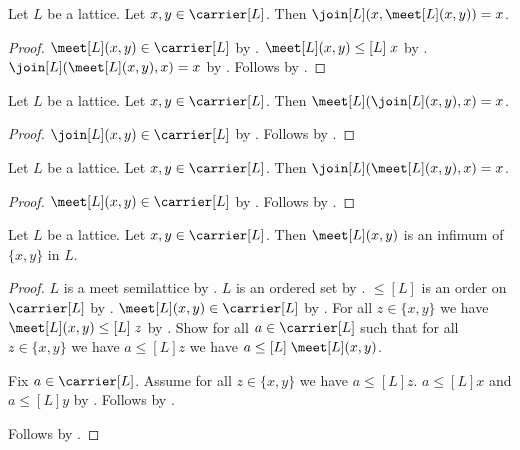 \begin{proposition}\label{join_meet_absorption}
    Let $L$ be a lattice.
    Let $x,y\in\carrier[L]$.
    Then $\join[L](x,\meet[L](x,y))=x$.
\end{proposition}
\begin{proof}
    $\meet[L](x,y)\in\carrier[L]$ by
        .
    $\meet[L](x,y)\mathrel{\leq[L]}x$ by
        .
    $\join[L](\meet[L](x,y),x)=x$ by
        .
    Follows by
        .
\end{proof}

\begin{proposition}\label{meet_join_absorption_commuted}
    Let $L$ be a lattice.
    Let $x,y\in\carrier[L]$.
    Then $\meet[L](\join[L](x,y),x)=x$.
\end{proposition}
\begin{proof}
    $\join[L](x,y)\in\carrier[L]$ by
        .
    Follows by
        .
\end{proof}

\begin{proposition}\label{join_meet_absorption_commuted}
    Let $L$ be a lattice.
    Let $x,y\in\carrier[L]$.
    Then $\join[L](\meet[L](x,y),x)=x$.
\end{proposition}
\begin{proof}
    $\meet[L](x,y)\in\carrier[L]$ by
        .
    Follows by
        .
\end{proof}

\begin{proposition}\label{meet_is_infimum_pair}
    Let $L$ be a lattice.
    Let $x,y\in\carrier[L]$.
    Then $\meet[L](x,y)$ is an infimum of $\{x,y\}$ in $L$.
\end{proposition}
\begin{proof}
    $L$ is a meet semilattice by .
    $L$ is an ordered set by .
    $\leq[L]$ is an order on $\carrier[L]$ by
        .
    $\meet[L](x,y)\in\carrier[L]$ by .
    For all $z\in\{x,y\}$ we have
        $\meet[L](x,y)\mathrel{\leq[L]}z$ by
        .
    Show for all $a\in\carrier[L]$ such that
        for all $z\in\{x,y\}$ we have $a\mathrel{\leq[L]}z$
        we have $a\mathrel{\leq[L]}\meet[L](x,y)$.
    \begin{subproof}
        Fix $a\in\carrier[L]$.
        Assume for all $z\in\{x,y\}$ we have
            $a\mathrel{\leq[L]}z$.
        $a\mathrel{\leq[L]}x$ and $a\mathrel{\leq[L]}y$ by
            .
        Follows by .
    \end{subproof}
    Follows by
        .
\end{proof}

